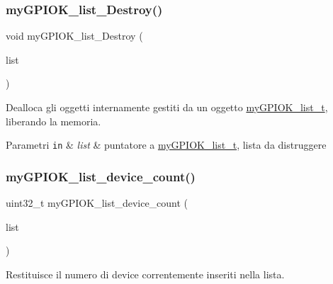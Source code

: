 \subsubsection{\texorpdfstring{my\+G\+P\+I\+O\+K\+\_\+list\+\_\+\+Destroy()}{myGPIOK\_list\_Destroy()}}
{\footnotesize\ttfamily void my\+G\+P\+I\+O\+K\+\_\+list\+\_\+\+Destroy (\begin{DoxyParamCaption}\item[{\hyperlink{structmy_g_p_i_o_k__list__t}{my\+G\+P\+I\+O\+K\+\_\+list\+\_\+t} $\ast$}]{list }\end{DoxyParamCaption})}



Dealloca gli oggetti internamente gestiti da un oggetto \hyperlink{structmy_g_p_i_o_k__list__t}{my\+G\+P\+I\+O\+K\+\_\+list\+\_\+t}, liberando la memoria. 


\begin{DoxyParams}[1]{Parametri}
\mbox{\tt in}  & {\em list} & puntatore a \hyperlink{structmy_g_p_i_o_k__list__t}{my\+G\+P\+I\+O\+K\+\_\+list\+\_\+t}, lista da distruggere \\
\hline
\end{DoxyParams}
\mbox{\label{group___device_list_ga731d5b5cbb96c6c5ef53936c23cdc58a}} 
\subsubsection{\texorpdfstring{my\+G\+P\+I\+O\+K\+\_\+list\+\_\+device\+\_\+count()}{myGPIOK\_list\_device\_count()}}
{\footnotesize\ttfamily uint32\+\_\+t my\+G\+P\+I\+O\+K\+\_\+list\+\_\+device\+\_\+count (\begin{DoxyParamCaption}\item[{\hyperlink{structmy_g_p_i_o_k__list__t}{my\+G\+P\+I\+O\+K\+\_\+list\+\_\+t} $\ast$}]{list }\end{DoxyParamCaption})}



Restituisce il numero di device correntemente inseriti nella lista. 


